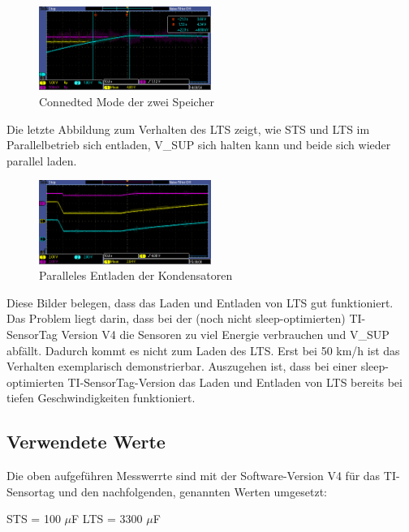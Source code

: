 \begin{figure}[ht]
   \includegraphics[width=0.5\textwidth]{4Resultate/imag/STS_LTS_connect.PNG}
    \caption{Connedted Mode der zwei Speicher}
    \label{connected_mode}
\end{figure}

Die letzte Abbildung zum Verhalten des LTS zeigt, wie STS und LTS im Parallelbetrieb sich entladen, V\_SUP sich halten kann und beide sich wieder parallel laden. 

\begin{figure}[ht]
   \includegraphics[width=0.5\textwidth]{4Resultate/imag/pic1.PNG}
    \caption{Paralleles Entladen der Kondensatoren}
    \label{parallel_entladen}
\end{figure}

Diese Bilder belegen, dass das Laden und Entladen von LTS gut funktioniert. Das Problem liegt darin, dass bei der (noch nicht sleep-optimierten) TI-SensorTag Version V4 die Sensoren zu viel Energie verbrauchen und V\_SUP abfällt. Dadurch kommt es nicht zum Laden des LTS. Erst bei 50 km/h ist das Verhalten exemplarisch demonstrierbar. Auszugehen ist, dass bei einer sleep-optimierten TI-SensorTag-Version das Laden und Entladen von LTS bereits bei tiefen Geschwindigkeiten funktioniert.

\subsection{Verwendete Werte}
\label{werte}

Die oben aufgeführen Messwerrte sind mit der Software-Version V4 für das TI-Sensortag und den nachfolgenden, genannten Werten umgesetzt:

STS = 100 $\mu$F
LTS = 3300 $\mu$F

